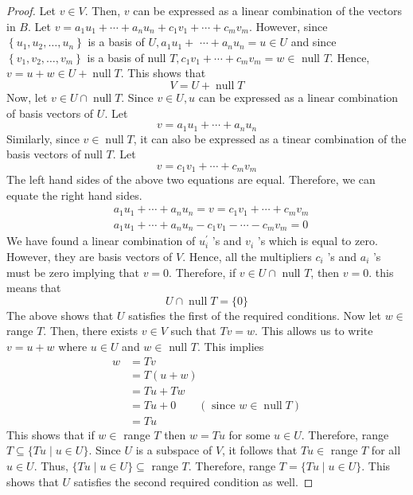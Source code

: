 \documentclass{article}
\theoremstyle{definition}
\begin{document}
\begin{proof}
Let $v \in V$. Then, $v$ can be expressed as a linear combination of the vectors in $B$.
Let $v=a_1 u_1+\cdots+a_n u_n+c_1 v_1+\cdots+c_m v_m$. However, since $\left\{u_1, u_2, \ldots, u_n\right\}$ is a basis of $U, a_1 u_1+$ $\cdots+a_n u_n=u \in U$ and since $\left\{v_1, v_2, \ldots, v_m\right\}$ is a basis of null $T, c_1 v_1+\cdots+c_m v_m=w \in$ null $T$.
Hence, $v=u+w \in U+\operatorname{null} T$. This shows that
$$
V=U+\operatorname{null} T
$$
Now, let $v \in U \cap \operatorname{null} T$.
Since $v \in U, u$ can be expressed as a linear combination of basis vectors of $U$. Let
$$
v=a_1 u_1+\cdots+a_n u_n
$$
Similarly, since $v \in \operatorname{null} T$, it can also be expressed as a tinear combination of the basis vectors of null $T$. Let
$$
v=c_1 v_1+\cdots+c_m v_m
$$
The left hand sides of the above two equations are equal. Therefore, we can equate the right hand sides.
$$
\begin{aligned}
& a_1 u_1+\cdots+a_n u_n=v=c_1 v_1+\cdots+c_m v_m \\
& a_1 u_1+\cdots+a_n u_n-c_1 v_1-\cdots-c_m v_m=0
\end{aligned}
$$
We have found a linear combination of $u_i^{\prime}$ 's and $v_i$ 's which is equal to zero. However, they are basis vectors of $V$. Hence, all the multipliers $c_i$ 's and $a_i$ 's must be zero implying that $v=0$.
Therefore, if $v \in U \cap$ null $T$, then $v=0$. this means that
$$
U \cap \operatorname{null} T=\{0\}
$$
The above shows that $U$ satisfies the first of the required conditions.
Now let $w \in$ range $T$. Then, there exists $v \in V$ such that $T v=w$. This allows us to write $v=u+w$ where $u \in U$ and $w \in$ null $T$. This implies
$$
\begin{aligned}
w & =T v \\
& =T(u+w) \\
& =T u+T w \\
& =T u+0 \quad \quad(\text { since } w \in \operatorname{null} T) \\
& =T u
\end{aligned}
$$
This shows that if $w \in$ range $T$ then $w=T u$ for some $u \in U$. Therefore, range $T \subseteq\{T u \mid u \in U\}$.
Since $U$ is a subspace of $V$, it follows that $T u \in$ range $T$ for all $u \in U$. Thus, $\{T u \mid u \in U\} \subseteq$ range $T$.
Therefore, range $T=\{T u \mid u \in U\}$.
This shows that $U$ satisfies the second required condition as well.
\end{proof}
\end{document}
